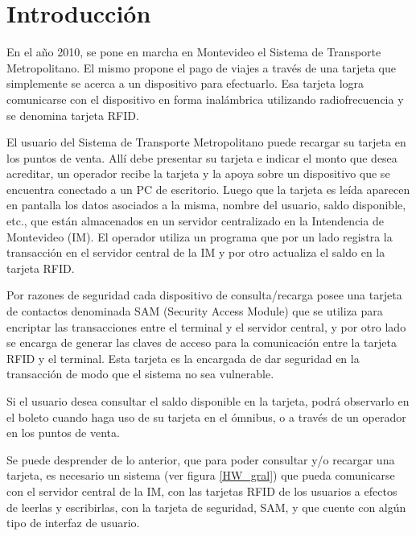 \chapter{Introducción}

En el año 2010, se pone en marcha en Montevideo el Sistema de Transporte Metropolitano. El mismo propone el pago de viajes a través de una tarjeta que simplemente se acerca a un dispositivo para efectuarlo. Esa tarjeta logra comunicarse con el dispositivo en forma inalámbrica utilizando radiofrecuencia y se denomina tarjeta RFID. 

\bigskip
El usuario del Sistema de Transporte Metropolitano puede recargar su tarjeta en los puntos de venta. Allí debe presentar su tarjeta e indicar el monto que desea acreditar, un operador recibe la tarjeta y la apoya sobre un dispositivo  que se encuentra conectado a un PC de escritorio. Luego que la tarjeta es leída aparecen en pantalla los datos asociados a la misma, nombre del usuario, saldo disponible, etc., que están almacenados en un servidor centralizado en la Intendencia de Montevideo (IM). El operador utiliza un programa que por un lado registra la transacción en el servidor central de la IM y por otro actualiza el saldo en la tarjeta RFID.

\bigskip
Por razones de seguridad cada  dispositivo de consulta/recarga posee una tarjeta de contactos denominada SAM (Security Access Module) que se utiliza para encriptar las transacciones entre el terminal y el servidor central, y por otro lado se encarga de generar las claves de acceso para la comunicación entre la tarjeta RFID y el terminal.  Esta tarjeta es la encargada de dar seguridad en la transacción de modo que el sistema no sea vulnerable.

\bigskip
Si el usuario desea consultar el saldo disponible en la tarjeta, podrá observarlo en el boleto cuando haga uso de su tarjeta en el ómnibus, o a través de un operador en los puntos de venta.

\bigskip
Se puede desprender de lo anterior, que para poder consultar y/o recargar una tarjeta, es necesario un sistema (ver figura \ref{HW_gral}) que pueda comunicarse con el servidor central de la IM, con las tarjetas RFID de los usuarios a efectos de leerlas y escribirlas, con la tarjeta de seguridad, SAM, y que cuente con algún tipo de interfaz de usuario. 

